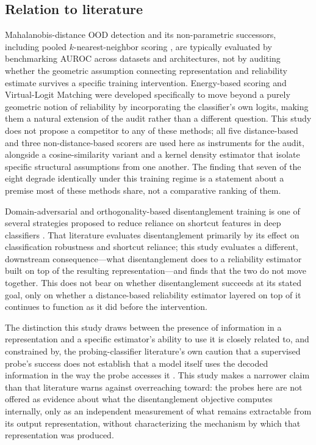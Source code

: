 \subsection{Relation to literature}
\label{sec:discussion-literature}

Mahalanobis-distance OOD detection \citep{lee2018simple} and its non-parametric successors, including pooled $k$-nearest-neighbor scoring \citep{sun2022out}, are typically evaluated by benchmarking AUROC across datasets and architectures, not by auditing whether the geometric assumption connecting representation and reliability estimate survives a specific training intervention. Energy-based scoring \citep{liu2020energy} and Virtual-Logit Matching \citep{wang2022vim} were developed specifically to move beyond a purely geometric notion of reliability by incorporating the classifier's own logits, making them a natural extension of the audit rather than a different question. This study does not propose a competitor to any of these methods; all five distance-based and three non-distance-based scorers are used here as instruments for the audit, alongside a cosine-similarity variant and a kernel density estimator that isolate specific structural assumptions from one another. The finding that seven of the eight degrade identically under this training regime is a statement about a premise most of these methods share, not a comparative ranking of them.

Domain-adversarial and orthogonality-based disentanglement training \citep{ganin2015unsupervised} is one of several strategies proposed to reduce reliance on shortcut features in deep classifiers \citep{geirhos2020shortcut}. That literature evaluates disentanglement primarily by its effect on classification robustness and shortcut reliance; this study evaluates a different, downstream consequence---what disentanglement does to a reliability estimator built on top of the resulting representation---and finds that the two do not move together. This does not bear on whether disentanglement succeeds at its stated goal, only on whether a distance-based reliability estimator layered on top of it continues to function as it did before the intervention.

The distinction this study draws between the presence of information in a representation and a specific estimator's ability to use it is closely related to, and constrained by, the probing-classifier literature's own caution that a supervised probe's success does not establish that a model itself uses the decoded information in the way the probe accesses it \citep{hewitt2019designing}. This study makes a narrower claim than that literature warns against overreaching toward: the probes here are not offered as evidence about what the disentanglement objective computes internally, only as an independent measurement of what remains extractable from its output representation, without characterizing the mechanism by which that representation was produced.

